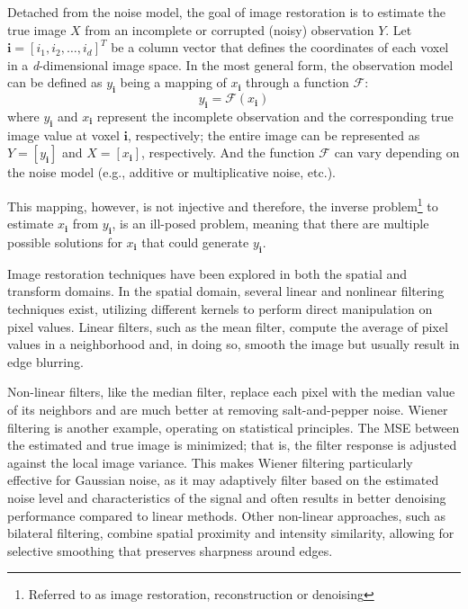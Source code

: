 Detached from the noise model, the goal of image restoration is to estimate the true image $X$ from an incomplete or corrupted (noisy) observation $Y$. Let $\mathbf{i} = [i_1, i_2, \dots, i_d]^T$ be a column vector that defines the coordinates of each voxel in a \textit{d}-dimensional image space. In the most general form, the observation model can be defined as $y_{\mathbf{i}}$ being a mapping of $x_{\mathbf{i}}$ through a function $\mathcal{F}$:
\begin{equation}\label{eq:observation-model}
    y_{\mathbf{i}} = \mathcal{F} (x_{\mathbf{i}})
\end{equation}
where $y_{\mathbf{i}}$ and $x_{\mathbf{i}}$ represent the incomplete observation and the corresponding true image value at voxel $\mathbf{i}$, respectively; the entire image can be represented as $Y = [y_{\mathbf{i}}]$ and $X = [x_{\mathbf{i}}]$, respectively. And the function $\mathcal{F}$ can vary depending on the noise model (e.g., additive or multiplicative noise, etc.).

This mapping, however, is not injective and therefore, the inverse problem\footnote{Referred to as image restoration, reconstruction or denoising} to estimate $x_{\mathbf{i}}$ from $y_{\mathbf{i}}$, is an ill-posed problem, meaning that there are multiple possible solutions for $x_{\mathbf{i}}$ that could generate $y_{\mathbf{i}}$.

Image restoration techniques have been explored in both the spatial and transform domains. In the spatial domain, several linear and nonlinear filtering techniques exist, utilizing different kernels to perform direct manipulation on pixel values. Linear filters, such as the mean filter, compute the average of pixel values in a neighborhood and, in doing so, smooth the image but usually result in edge blurring.

Non-linear filters, like the median filter, replace each pixel with the median value of its neighbors and are much better at removing salt-and-pepper noise. Wiener filtering is another example, operating on statistical principles. The \gls{MSE} between the estimated and true image is minimized; that is, the filter response is adjusted against the local image variance. This makes Wiener filtering particularly effective for Gaussian noise, as it may adaptively filter based on the estimated noise level and characteristics of the signal and often results in better denoising performance compared to linear methods. Other non-linear approaches, such as bilateral filtering, combine spatial proximity and intensity similarity, allowing for selective smoothing that  preserves sharpness around edges. 

